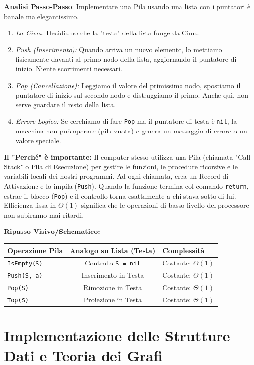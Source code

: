 \documentclass[a4paper, 11pt]{report}
\begin{document}
\textbf{Analisi Passo-Passo:}
Implementare una Pila usando una lista con i puntatori è banale ma elegantissimo.
\begin{enumerate}
    \item \textit{La Cima:} Decidiamo che la "testa" della lista funge da Cima.
    \item \textit{Push (Inserimento):} Quando arriva un nuovo elemento, lo mettiamo fisicamente davanti al primo nodo della lista, aggiornando il puntatore di inizio. Niente scorrimenti necessari.
    \item \textit{Pop (Cancellazione):} Leggiamo il valore del primissimo nodo, spostiamo il puntatore di inizio sul secondo nodo e distruggiamo il primo. Anche qui, non serve guardare il resto della lista.
    \item \textit{Errore Logico:} Se cerchiamo di fare \texttt{Pop} ma il puntatore di testa è \texttt{nil}, la macchina non può operare (pila vuota) e genera un messaggio di errore o un valore speciale.
\end{enumerate}

\textbf{Il "Perché" è importante:}
Il computer stesso utilizza una Pila (chiamata "Call Stack" o Pila di Esecuzione) per gestire le funzioni, le procedure ricorsive e le variabili locali dei nostri programmi. Ad ogni chiamata, crea un Record di Attivazione e lo impila (\texttt{Push}). Quando la funzione termina col comando \texttt{return}, estrae il blocco (\texttt{Pop}) e il controllo torna esattamente a chi stava sotto di lui. Efficienza fissa in $\Theta(1)$ significa che le operazioni di basso livello del processore non subiranno mai ritardi.

\textbf{Ripasso Visivo/Schematico:}
\begin{center}
\begin{tabular}{|l|c|p{7cm}|}
\hline
\textbf{Operazione Pila} & \textbf{Analogo su Lista (Testa)} & \textbf{Complessità} \\
\hline
\texttt{IsEmpty(S)} & Controllo \texttt{S = nil} & Costante: $\Theta(1)$ \\
\hline
\texttt{Push(S, a)} & Inserimento in Testa & Costante: $\Theta(1)$ \\
\hline
\texttt{Pop(S)} & Rimozione in Testa & Costante: $\Theta(1)$ \\
\hline
\texttt{Top(S)} & Proiezione in Testa & Costante: $\Theta(1)$ \\
\hline
\end{tabular}
\end{center}
\chapter{Implementazione delle Strutture Dati e Teoria dei Grafi}
\end{document}
